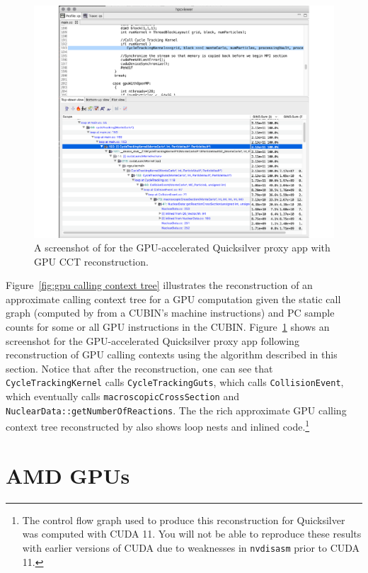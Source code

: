 \begin{figure}[t]
\centering
\includegraphics[width=\textwidth]{fig/qs-cct.pdf}
\caption{A screenshot of \hpcviewer{} for the GPU-accelerated Quicksilver proxy app with GPU CCT reconstruction.}
\label{qs-cct}
\end{figure}

Figure~\ref{fig:gpu calling context tree} illustrates the reconstruction of an approximate calling context tree for a GPU computation given the static call graph (computed by \hpcstruct{} from a CUBIN's machine instructions) and PC sample counts for some or all GPU instructions in the CUBIN. Figure~\ref{qs-cct} shows an \hpcviewer{} screenshot for the GPU-accelerated Quicksilver proxy app following reconstruction of GPU calling contexts using the algorithm described in this section. Notice that after the reconstruction, one can see that \verb|CycleTrackingKernel| calls \verb|CycleTrackingGuts|, which calls \verb|CollisionEvent|, which eventually calls  \verb|macroscopicCrossSection| and \verb|NuclearData::getNumberOfReactions|. The the rich  approximate GPU calling context tree reconstructed by \hpcprof{} also shows loop nests and inlined code.\footnote{The control flow graph used to produce this reconstruction for Quicksilver was computed with CUDA 11. You will not be able to reproduce these results with earlier versions of CUDA due to weaknesses in
{\tt nvdisasm} prior to CUDA 11.}

\clearpage

\section{AMD GPUs}
\label{sec:amd-gpu}

